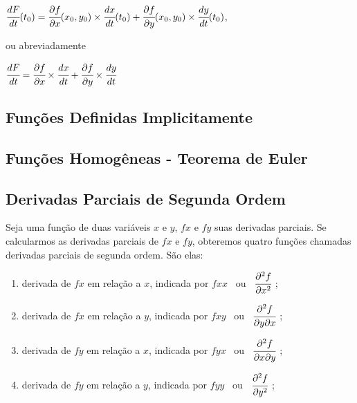 			\bigskip

			{\LARGE $\cfrac{dF}{dt}(t_{0}) = \cfrac{\partial f}{\partial x}(x_{0}, y_{0}) \times \cfrac{dx}{dt}(t_{0}) + \cfrac{\partial f}{\partial y}(x_{0}, y_{0}) \times \cfrac{dy}{dt}(t_{0})$},

			\bigskip

			ou abreviadamente

			\medskip

			$\cfrac{dF}{dt} = \cfrac{\partial f}{\partial x} \times \cfrac{dx}{dt} + \cfrac{\partial f}{\partial y} \times \cfrac{dy}{dt}$
			
	\subsection{Funções Definidas Implicitamente \cite{morettin}}

	\subsection{Funções Homogêneas - Teorema de Euler \cite{morettin}}

	\subsection{Derivadas Parciais de Segunda Ordem \cite{morettin}}

		Seja uma função de duas variáveis $x$ e $y$, $fx$  e $fy$ suas derivadas parciais. Se calcularmos as derivadas parciais de $fx$ e $fy$, obteremos quatro funções chamadas derivadas parciais de segunda ordem. São elas:

		\begin{enumerate}[label=(\alph*)]

			\item derivada de $fx$ em relação a $x$, indicada por $fxx$ \ ou \ $\cfrac{\partial^{2}f}{\partial x^{2}}$ ;

			\item derivada de $fx$ em relação a $y$, indicada por $fxy$ \ ou \ $\cfrac{\partial^{2}f}{\partial y\partial x}$ ;

			\item derivada de $fy$ em relação a $x$, indicada por $fyx$ \ ou \ $\cfrac{\partial^{2}f}{\partial x\partial y}$ ;

			\item derivada de $fy$ em relação a $y$, indicada por $fyy$ \ ou \ $\cfrac{\partial^{2}f}{\partial y^{2}}$ ;

		\end{enumerate}
		
